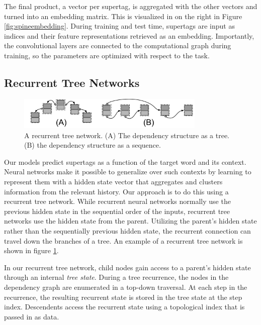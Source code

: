 \documentclass[11pt]{article}
\begin{document}
The final product, a vector per supertag, is aggregated with the other vectors
and turned into an embedding matrix.
%
This is visualized in on the right in Figure \ref{fig:spineembedding}.
%
During training and test time, supertags are input as indices and their feature
representations retrieved as an embedding.
%
Importantly, the convolutional layers are connected to the computational graph during training, so the parameters are optimized with respect to the task.


\subsection{Recurrent Tree Networks}
\label{subsec:rtn}

\begin{figure}[tH!]
\centering
\includegraphics[width=0.8\textwidth]{rtn2.pdf}
\caption{A recurrent tree network. (A) The dependency structure as a tree.  (B) the dependency structure as a sequence.}
 \label{fig:rtn}
\end{figure}

Our models predict supertags as a function of the target word and its
context.  Neural networks make it possible to generalize over such
contexts by learning to represent them with a hidden state vector that
aggregates and clusters information from the relevant history.  Our
approach is to do this using a recurrent tree network.
%
While recurrent neural networks normally use the previous hidden state in the sequential order of the inputs,
recurrent tree networks use the hidden state from the parent.
%
Utilizing the parent's hidden state rather than the sequentially previous hidden
state, the recurrent connection can travel down the branches of a tree.
%
An example of a recurrent tree network is shown in figure \ref{fig:rtn}.



In our recurrent tree network, child nodes gain access to a parent's hidden state
through an internal \emph{tree state}.
%
During a tree recurrence, the nodes in the dependency graph are enumerated in a
top-down traversal.
%
At each step in the recurrence, the resulting recurrent state is stored in the
tree state at the step index.
%
Descendents access the recurrent state using a topological index that is passed in as data.
\end{document}
